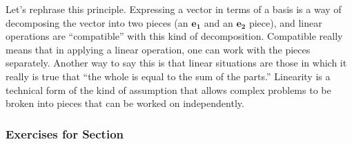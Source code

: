 \documentclass{book}
\begin{document}
Let's rephrase this principle. Expressing a vector in terms of a basis is
a way of decomposing the vector into two pieces (an $\mathbf{e_1}$ and an $\mathbf{e_2}$ piece),
and linear operations are ``compatible'' with this kind of decomposition.
Compatible really means that in applying a linear operation, one can
work with the pieces separately. Another way to say this is that linear
situations are those in which it really is true that ``the whole is equal
to the sum of the parts.'' Linearity is a technical form of the kind of
assumption that allows complex problems to be broken into pieces that
can be worked on independently.

\subsubsection {Exercises for Section \thesection}
\end{document}
